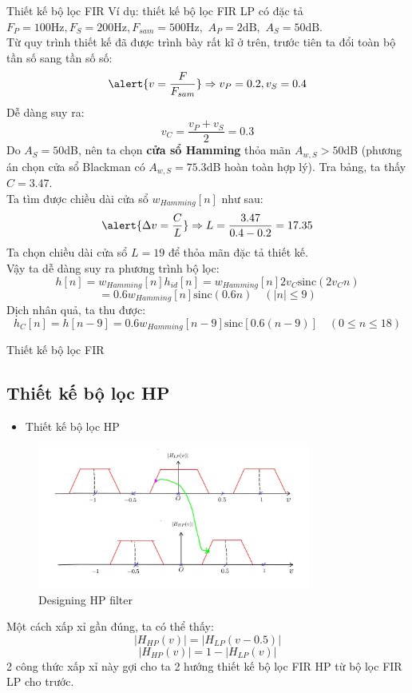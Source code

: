 \documentclass[8pt]{beamer}
\begin{document}
\begin{frame}{Thiết kế bộ lọc FIR}
	Ví dụ: thiết kế bộ lọc FIR LP có đặc tả $F_{P}=100\text{Hz},F_{S}=200\text{Hz},F_{sam}=500\text{Hz},$ $A_{P}=2\text{dB},$ $A_{S}=50\text{dB}.$
	\\Từ quy trình thiết kế đã được trình bày rất kĩ ở trên, trước tiên ta đổi toàn bộ tần số sang tần số số:
	$$\alert{v=\frac{F}{F_{sam}}}\Rightarrow v_{P}=0.2,v_{S}=0.4$$
	Dễ dàng suy ra: $$v_{C}=\frac{v_{P}+v_{S}}{2}=0.3$$
	Do $A_{S}=50$dB, nên ta chọn \textbf{cửa sổ Hamming} thỏa mãn $A_{w,S}>50$dB (phương án chọn cửa sổ Blackman có $A_{w,S}=75.3$dB hoàn toàn hợp lý). Tra bảng, ta thấy $C=3.47$.
	\\ Ta tìm được chiều dài cửa sổ $w_{Hamming}[n]$ như sau:
	$$\alert{\Delta v=\frac{C}{L}}\Rightarrow L=\frac{3.47}{0.4-0.2}=17.35$$
	Ta chọn chiều dài cửa sổ $L=19$ để thỏa mãn đặc tả thiết kế.
	\\ Vậy ta dễ dàng suy ra phương trình bộ lọc:
	$$h[n]=w_{Hamming}[n]h_{id}[n]=w_{Hamming}[n]2v_{C}\text{sinc}(2v_{C}n)$$
	$$=0.6w_{Hamming}[n]\text{sinc}(0.6n)\quad\left(|n|\leq 9\right)$$
	Dịch nhân quả, ta thu được:
	$$h_{C}[n]=h[n-9]=0.6w_{Hamming}[n-9]\text{sinc}[0.6(n-9)]\quad(0\leq n\leq 18)$$
\end{frame}
\begin{frame}{Thiết kế bộ lọc FIR}
	\subsection{Thiết kế bộ lọc HP}
	\begin{itemize}
		\item Thiết kế bộ lọc HP
	\end{itemize}
	\begin{figure}[h]
		\includegraphics[width=0.8\textwidth]{10.jpg}
		\caption{Designing HP filter}			\label{fig:re11}
	\end{figure}
	Một cách xấp xỉ gần đúng, ta có thể thấy:
	$$|H_{HP}(v)|=|H_{LP}(v-0.5)|$$ $$|H_{HP}(v)|=1-|H_{LP}(v)|$$
	2 công thức xấp xỉ này gợi cho ta 2 hướng thiết kế bộ lọc FIR HP từ bộ lọc FIR LP cho trước.
\end{frame}
\end{document}
